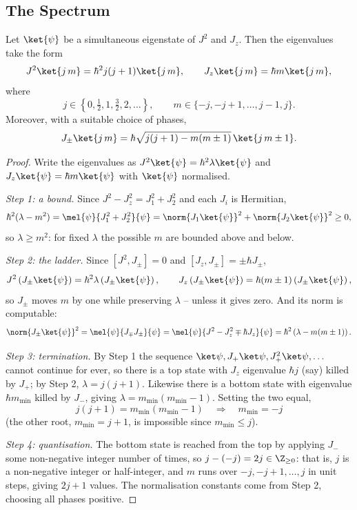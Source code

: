 \subsection{The Spectrum}

\begin{theorem}
    Let $\ket{\psi}$ be a simultaneous eigenstate of $J^2$ and $J_z$. Then the eigenvalues take the form
    $$
    J^2 \ket{j\,m} = \hbar^2 j(j+1)\ket{j\,m}, \qquad J_z \ket{j\, m} = \hbar m \ket{j\,m},
    $$
    where
    $$
    j \in \left\{ 0, \tfrac12, 1, \tfrac32, 2, \dots \right\}, \qquad m \in \{-j, -j+1, \dots, j-1, j\}.
    $$
    Moreover, with a suitable choice of phases,
    $$
    J_\pm \ket{j\,m} = \hbar\sqrt{j(j+1) - m(m\pm1)}\,\ket{j\, m\pm 1}.
    $$
\end{theorem}
\begin{proof}
    Write the eigenvalues as $J^2\ket{\psi} = \hbar^2\lambda\ket{\psi}$ and $J_z\ket{\psi} = \hbar m \ket{\psi}$ with $\ket{\psi}$ normalised.

    \emph{Step 1: a bound.} Since $J^2 - J_z^2 = J_1^2 + J_2^2$ and each $J_i$ is Hermitian,
    $$
    \hbar^2(\lambda - m^2) = \mel{\psi}{J_1^2 + J_2^2}{\psi} = \norm{J_1\ket{\psi}}^2 + \norm{J_2\ket{\psi}}^2 \geq 0,
    $$
    so $\lambda \geq m^2$: for fixed $\lambda$ the possible $m$ are bounded above and below.

    \emph{Step 2: the ladder.} Since $[J^2, J_\pm] = 0$ and $[J_z, J_\pm] = \pm\hbar J_\pm$,
    $$
    J^2 \left( J_\pm \ket{\psi} \right) = \hbar^2 \lambda \left( J_\pm\ket{\psi}\right), \qquad J_z \left(J_\pm\ket{\psi}\right) = \hbar(m\pm1)\left(J_\pm\ket{\psi}\right),
    $$
    so $J_\pm$ moves $m$ by one while preserving $\lambda$ -- unless it gives zero. And its norm is computable:
    $$
    \norm{J_\pm \ket{\psi}}^2 = \mel{\psi}{J_\mp J_\pm}{\psi} = \mel{\psi}{J^2 - J_z^2 \mp \hbar J_z}{\psi} = \hbar^2 \left( \lambda - m(m\pm1) \right).
    $$

    \emph{Step 3: termination.} By Step 1 the sequence $\ket\psi, J_+\ket\psi, J_+^2\ket\psi, \dots$ cannot continue for ever, so there is a top state with $J_z$ eigenvalue $\hbar j$ (say) killed by $J_+$; by Step 2, $\lambda = j(j+1)$. Likewise there is a bottom state with eigenvalue $\hbar m_{\min}$ killed by $J_-$, giving $\lambda = m_{\min}(m_{\min}-1)$. Setting the two equal,
    $$
    j(j+1) = m_{\min}(m_{\min}-1) \quad \Longrightarrow \quad m_{\min} = -j
    $$
    (the other root, $m_{\min} = j+1$, is impossible since $m_{\min}\leq j$).

    \emph{Step 4: quantisation.} The bottom state is reached from the top by applying $J_-$ some non-negative integer number of times, so $j - (-j) = 2j \in \Z_{\geq0}$: that is, $j$ is a non-negative integer or half-integer, and $m$ runs over $-j, -j+1, \dots, j$ in unit steps, giving $2j+1$ values. The normalisation constants come from Step 2, choosing all phases positive.
\end{proof}


